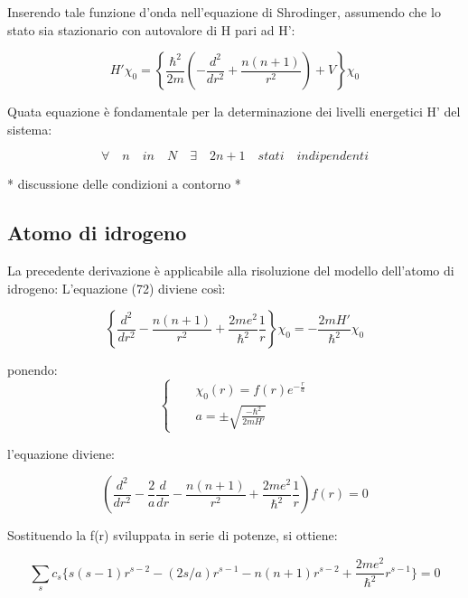 \documentclass{article}
\begin{document}
Inserendo tale funzione d'onda nell'equazione di Shrodinger, assumendo che lo stato sia stazionario con autovalore di H pari ad H':

\begin{equation}
    H' \chi_0=\left\{\frac{\hbar^2}{2m}\left( -\frac{d^2}{dr^2}+\frac{n(n+1)}{r^2}\right)+V \right\}\chi_0
\end{equation}

Quata equazione è fondamentale per la determinazione dei livelli energetici H' del sistema:

\begin{equation}
\forall \quad n \quad in \quad N \quad \exists \quad 2n+1 \quad stati \quad indipendenti
\end{equation}


* discussione delle condizioni a contorno *

\subsection{Atomo di idrogeno}
La precedente derivazione è applicabile alla risoluzione del modello dell'atomo di idrogeno:
L'equazione (72) diviene così:

\begin{equation}
 \left\{\frac{d^2}{dr^2} -\frac{n(n+1)}{r^2} +\frac{2me^2}{\hbar^2}\frac{1}{r} \right\}\chi_0= -\frac{2mH'}{\hbar^2}\chi_0
\end{equation}

ponendo:
\begin{equation}
    \left\{
    \begin{aligned}
       && \chi_0(r)=f(r)e^{-\frac{r}{a}} \\
         && a=\pm \sqrt{\frac{-\hbar^2}{2mH'}}
    \end{aligned}
    \right.        
\end{equation}

l'equazione diviene:

\begin{equation}
        \left(\frac{d^2}{dr^2} -\frac{2}{a}\frac{d}{dr} -\frac{n(n+1)}{r^2} +\frac{2me^2}{\hbar^2}\frac{1}{r}\right)f(r)=0
\end{equation}

Sostituendo la f(r) sviluppata in serie di potenze, si ottiene:

\begin{equation}
    \sum_{s} c_s \{s(s-1)r^{s-2}-(2s/a)r^{s-1}-n(n+1)r^{s-2}+\frac{2me^2}{\hbar^2}r^{s-1} \}=0
\end{equation}
\end{document}
